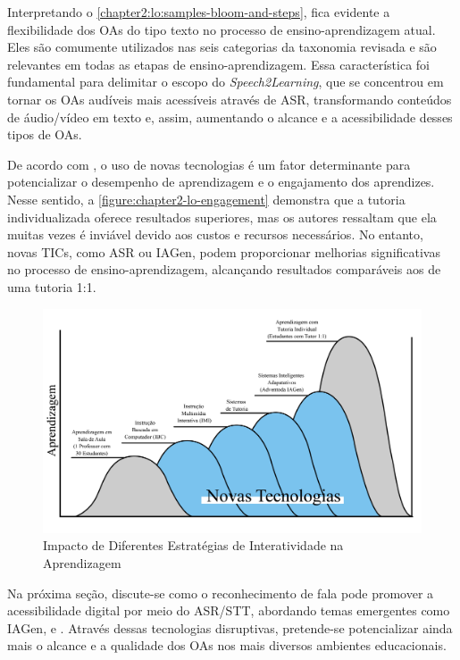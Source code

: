 Interpretando o \autoref{chapter2:lo:samples-bloom-and-steps}, fica evidente a flexibilidade dos OAs do tipo texto no processo de ensino-aprendizagem atual. Eles são comumente utilizados nas seis categorias da taxonomia revisada e são relevantes em todas as etapas de ensino-aprendizagem. Essa característica foi fundamental para delimitar o escopo do \textit{Speech2Learning}, que se concentrou em tornar os OAs audíveis mais acessíveis através de ASR, transformando conteúdos de áudio/vídeo em texto e, assim, aumentando o alcance e a acessibilidade desses tipos de OAs.

De acordo com , o uso de novas tecnologias é um fator determinante para potencializar o desempenho de aprendizagem e o engajamento dos aprendizes. Nesse sentido, a \autoref{figure:chapter2-lo-engagement} demonstra que a tutoria individualizada oferece resultados superiores, mas os autores ressaltam que ela muitas vezes é inviável devido aos custos e recursos necessários. No entanto, novas TICs, como ASR ou IAGen, podem proporcionar melhorias significativas no processo de ensino-aprendizagem, alcançando resultados comparáveis aos de uma tutoria 1:1.

\begin{figure}[htb]
\centering
\caption{Impacto de Diferentes Estratégias de Interatividade na Aprendizagem}
\label{figure:chapter2-lo-engagement}
\includegraphics[width=1\textwidth]{images/chapter2-lo-engagement.jpg}
\end{figure}

Na próxima seção, discute-se como o reconhecimento de fala pode promover a acessibilidade digital por meio do ASR/STT, abordando temas emergentes como IAGen,  e . Através dessas tecnologias disruptivas, pretende-se potencializar ainda mais o alcance e a qualidade dos OAs nos mais diversos ambientes educacionais.

